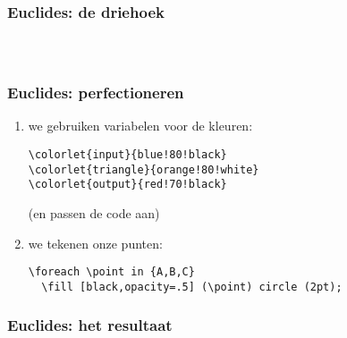 \documentclass[]{beamer}
\begin{document}
\begin{frame}
  \frametitle{Euclides: de driehoek}

  \begin{columns}
    \begin{column}{.67\textwidth}
      \inputminted[fontsize = \scriptsize]{latex}{tikz/triangle/4a.tikz}
    \end{column}
    \begin{column}{.33\textwidth}
      
    \end{column}
  \end{columns}
\end{frame}

\begin{frame}[fragile]
  \frametitle{Euclides: perfectioneren}

  \begin{enumerate}
    \item we gebruiken variabelen voor de kleuren:
      \begin{verbatim}
\colorlet{input}{blue!80!black}
\colorlet{triangle}{orange!80!white}
\colorlet{output}{red!70!black}
      \end{verbatim}
      (en passen de code aan)
    \item\pause we tekenen onze punten:
      \begin{verbatim}
\foreach \point in {A,B,C}
  \fill [black,opacity=.5] (\point) circle (2pt);
      \end{verbatim}
  \end{enumerate}
\end{frame}

\begin{frame}
  \frametitle{Euclides: het resultaat}

  \centering
  
\end{frame}
\end{document}
